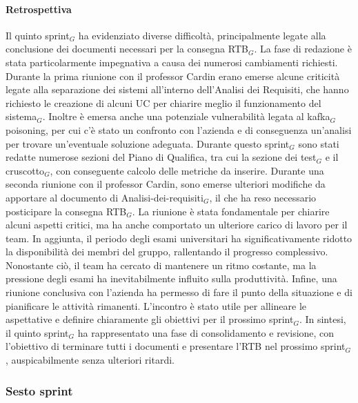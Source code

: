 \documentclass[10pt]{article}
\begin{document}
{{{{{{    \paragraph{Retrospettiva}\mbox{}\vspace{0.4em}

    Il quinto sprint$_G$ ha evidenziato diverse difficoltà, principalmente legate alla conclusione dei documenti necessari per la consegna RTB$_G$. La fase di redazione è stata particolarmente impegnativa a causa dei numerosi cambiamenti richiesti.
    Durante la prima riunione con il professor Cardin erano emerse alcune criticità legate alla separazione dei sistemi all'interno dell'Analisi dei Requisiti, che hanno richiesto le creazione di alcuni UC per chiarire meglio il funzionamento del sistema$_G$. 
    Inoltre è emersa anche una potenziale vulnerabilità legata al kafka$_G$ poisoning, per cui c'è stato un confronto con l'azienda e di conseguenza un'analisi per trovare un'eventuale soluzione adeguata.
    Durante questo sprint$_G$ sono stati redatte numerose sezioni del Piano di Qualifica, tra cui la sezione dei test$_G$ e  il cruscotto$_G$, con conseguente calcolo delle metriche da inserire.
    Durante una seconda riunione con il professor Cardin, sono emerse ulteriori modifiche da apportare al documento di Analisi-dei-requisiti$_G$, il che ha reso necessario posticipare la consegna RTB$_G$. 
    La riunione è stata fondamentale per chiarire alcuni aspetti critici, ma ha anche comportato un ulteriore carico di lavoro per il team.
    In aggiunta, il periodo degli esami universitari ha significativamente ridotto la disponibilità dei membri del gruppo, rallentando il progresso complessivo. 
    Nonostante ciò, il team ha cercato di mantenere un ritmo costante, ma la pressione degli esami ha inevitabilmente influito sulla produttività.
    Infine, una riunione conclusiva con l'azienda ha permesso di fare il punto della situazione e di pianificare le attività rimanenti. L'incontro è stato utile per allineare le aspettative e definire chiaramente gli obiettivi per il prossimo sprint$_G$. 
    In sintesi, il quinto sprint$_G$ ha rappresentato una fase di consolidamento e revisione, con l'obiettivo di terminare tutti i documenti e presentare l'RTB nel prossimo sprint$_G$, auspicabilmente senza ulteriori ritardi.



\newpage
\subsubsection{Sesto sprint}
\label{sesto-sprint$_G$}
    
}}}}}}
\end{document}
